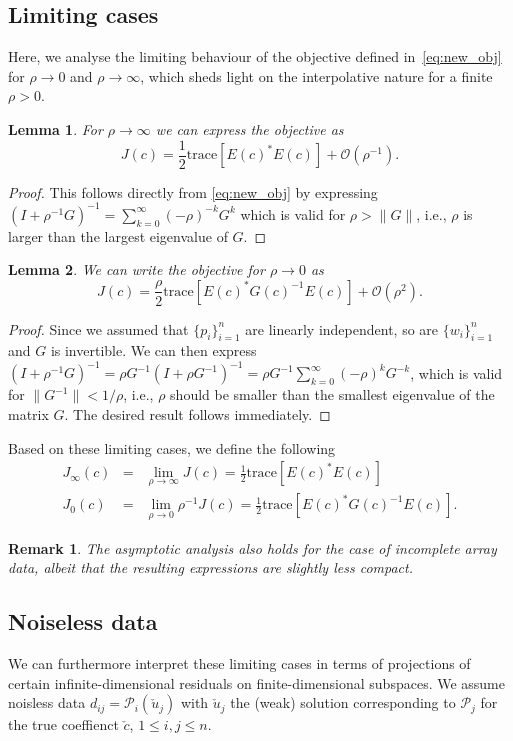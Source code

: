 \documentclass[12pt]{amsart}
\newtheorem{rem}{Remark}
\newtheorem{lma}{Lemma}
\begin{document}
\subsection{Limiting cases}
Here, we analyse the limiting behaviour of the objective defined in~\eqref{eq:new_obj} for $\rho\rightarrow 0$ and $\rho \rightarrow \infty$, which sheds light on the interpolative nature for a finite $\rho >0$. 
\begin{lma}
For $\rho \rightarrow \infty$ we can express the objective as
\[
J(c) =  {\textstyle\frac{1}{2}}\text{trace}\left[E(c)^*E(c)\right] + \mathcal{O}(\rho^{-1}).
\]
\end{lma}
\begin{proof}
This follows directly from \eqref{eq:new_obj} by expressing $(I + \rho^{-1}G)^{-1} = \sum_{k=0}^\infty (-\rho)^{-k}G^k$ which is valid for $\rho > \|G\|$, i.e., $\rho$ is larger than the largest eigenvalue of $G$.
\end{proof}
\begin{lma}
\label{lma:rho_zero}
We can write the objective for $\rho \rightarrow 0$ as
\[
J(c) = {\textstyle\frac{\rho}{2}}\text{trace}\left[E(c)^*G(c)^{-1}E(c)\right] + \mathcal{O}(\rho^2).
\]
\end{lma}
\begin{proof}
Since we assumed that $\{p_i\}_{i=1}^n$ are linearly independent, so are $\{w_i\}_{i=1}^n$ and $G$ is invertible. We can then express $(I + \rho^{-1}G)^{-1}=\rho G^{-1}(I + \rho G^{-1})^{-1} = \rho G^{-1}\sum_{k=0}^{\infty} (-\rho)^k G^{-k}$, which is valid for $ \|G^{-1}\| < 1/\rho$, i.e., $\rho$ should be smaller than the smallest eigenvalue of the matrix $G$. The desired result follows immediately.
\end{proof}
Based on these limiting cases, we define the following
\begin{eqnarray}
J_\infty(c) &=& \lim_{\rho\rightarrow \infty} J(c) ={\textstyle\frac{1}{2}}\text{trace}\left[E(c)^*E(c)\right]    \label{eq:Jinfty}\\
J_0(c) &=& \lim_{\rho\rightarrow 0} \rho^{-1}J(c) =  {\textstyle\frac{1}{2}}\text{trace}\left[E(c)^*G(c)^{-1}E(c)\right].\label{eq:J0}
\end{eqnarray}
{\begin{rem}
The asymptotic analysis also holds for the case of incomplete array data, albeit that the resulting expressions are slightly less compact.
\end{rem}
}
\subsection{Noiseless data}
We can furthermore interpret these limiting cases in terms of projections of certain infinite-dimensional residuals on finite-dimensional subspaces. We assume noisless data $d_{ij} = \mathcal{P}_i(\check{u}_j)$ with $\check{u}_j$ the (weak) solution corresponding to $\mathcal{P}_j$ for the true coeffienct $\check{c}$, $1\leq i,j \leq n$.
\end{document}
